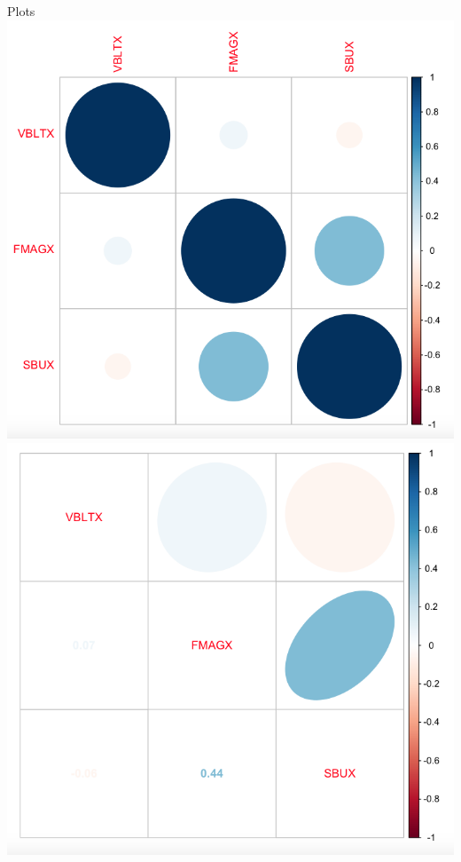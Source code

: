 \documentclass[letterpaper,12pt]{article}
\begin{document}
\item  Plots \\
    \includegraphics[scale = 0.5]{corrplot} \\
    \includegraphics[scale = 0.5]{corrplot_mixed}
\end{document}
